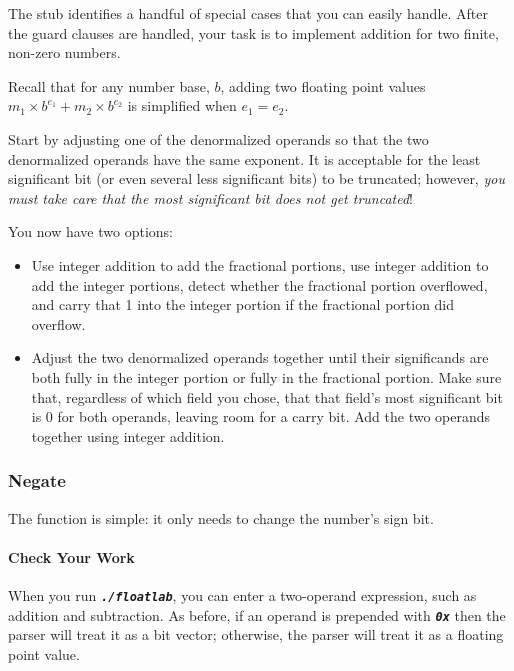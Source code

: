     The  stub identifies a handful of special cases that you can easily handle.
    After the guard clauses are handled, your task is to implement addition for two finite, non-zero numbers.

    Recall that for any number base, $b$, adding two floating point values $m_1 \times b^{e_1} + m_2 \times b^{e_2}$ is simplified when $e_1 = e_2$.

    Start by adjusting one of the denormalized operands so that the two denormalized operands have the same exponent.
    It is acceptable for the least significant bit (or even several less significant bits) to be truncated;
    however, \textit{you must take care that the most significant bit does not get truncated}!

    You now have two options:
    \begin{itemize}
        \item Use integer addition to add the fractional portions, use integer addition to add the integer portions, detect whether the fractional portion overflowed, and carry that 1 into the integer portion if the fractional portion did overflow.
        \item Adjust the two denormalized operands together until their significands are both fully in the integer portion or fully in the fractional portion.
            Make sure that, regardless of which field you chose, that that field's most significant bit is 0 for both operands, leaving room for a carry bit.
            Add the two operands together using integer addition.
    \end{itemize}

    \subsubsection{Negate}

    The  function is simple: it only needs to change the number's sign bit.

    \paragraph*{Check Your Work}

    When you run \texttt{\textbf{\textit{./floatlab}}}, you can enter a two-operand expression, such as addition and subtraction.
    As before, if an operand is prepended with \texttt{\textbf{\textit{0x}}} then the parser will treat it as a bit vector;
    otherwise, the parser will treat it as a floating point value.

